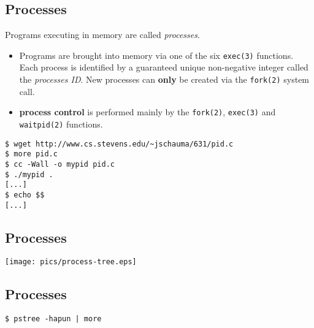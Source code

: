 \documentclass[xga]{xdvislides}
\begin{document}
\subsection{Processes}
Programs executing in memory are called {\em processes}.
\begin{itemize}
	\item Programs are brought into memory via one of the
		six {\tt exec(3)} functions.  Each process is identified
		by a guaranteed unique non-negative integer called the
		{\em processes ID}. New processes can {\bf only} be
		created via the {\tt fork(2)} system call.
	\item {\bf process control} is performed mainly by the
		{\tt fork(2)}, {\tt exec(3)} and {\tt waitpid(2)} functions.
\end{itemize}
\vspace*{\fill}
\begin{verbatim}
$ wget http://www.cs.stevens.edu/~jschauma/631/pid.c
$ more pid.c
$ cc -Wall -o mypid pid.c
$ ./mypid .
[...]
$ echo $$
[...]
\end{verbatim}
\vspace*{\fill}

\subsection{Processes}
\begin{center}
\texttt{[image: pics/process-tree.eps]} \\
\end{center}

\subsection{Processes}
\vspace*{\fill}
\Huge
\begin{center}
	{\tt \$ pstree -hapun | more}
\end{center}
\Normalsize
\vspace*{\fill}
\end{document}
